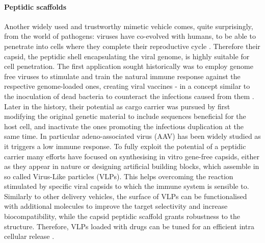 \paragraph{Peptidic scaffolds} Another widely used and trustworthy mimetic vehicle comes, quite surprisingly, from the world of pathogens: viruses have co-evolved with humans, to be able to penetrate into cells where they complete their reproductive cycle \cite{Lobo2009}. Therefore their capsid, the peptidic shell encapsulating the viral genome, is highly suitable for cell penetration. The first application sought historically was to employ genome free viruses to stimulate and train the natural immune response against the respective genome-loaded ones, creating viral vaccines - in a concept similar to the inoculation of dead bacteria to counteract the infections caused from them \cite{Lauer2017}.
Later in the history, their potential as cargo carrier was pursued by first modifying the original genetic material to include sequences beneficial for the host cell, and inactivate the ones promoting the infectious duplication at the same time. In particular adeno-associated virus (AAV) has been widely studied \cite{Daya2008} as it triggers a low immune response.
%
To fully exploit the potential of a peptidic carrier many efforts have focused on synthesising in vitro gene-free capsids, either as they appear in nature \cite{Wu2009} or designing artificial building blocks, which assemble in so called Virus-Like particles (VLPs). This helps overcoming the reaction stimulated by specific viral capsids to which the immune system is sensible to.
%
Similarly to other delivery vehicles, the surface of VLPs can be functionalised with additional molecules to improve the target selectivity and increase biocompatibility, while the capsid peptidic scaffold grants robustness to the structure. Therefore, VLPs loaded with drugs can be tuned for an efficient intra cellular release \cite{Ma2012}.

